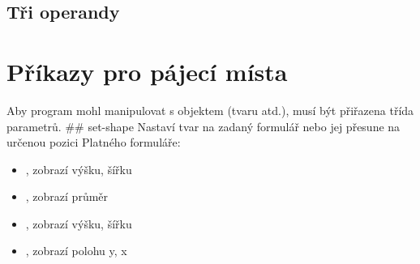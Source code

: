 \documentclass[letterpaper,10pt,czech]{sphinxmanual}
\begin{document}
\subsection{Tři operandy}
\label{\detokenize{parameter-programs:tri-operandy}}
\begin{sphinxVerbatim}[commandchars=\\\{\}]
    

   
   
  
  
  

    
          
          
\end{sphinxVerbatim}


\section{Příkazy pro pájecí místa}
\label{\detokenize{parameter-programs:prikazy-pro-pajeci-mista}}
Aby program mohl manipulovat s objektem (tvaru atd.),
musí být přiřazena třída parametrů. \#\# set-shape
 Nastaví tvar na zadaný
formulář nebo jej přesune na určenou pozici Platného formuláře:
\begin{itemize}
\item {} 
, zobrazí výšku, šířku

\item {} 
, zobrazí průměr

\item {} 
, zobrazí výšku, šířku

\item {} 
, zobrazí polohu y, x

\end{itemize}
\end{document}
